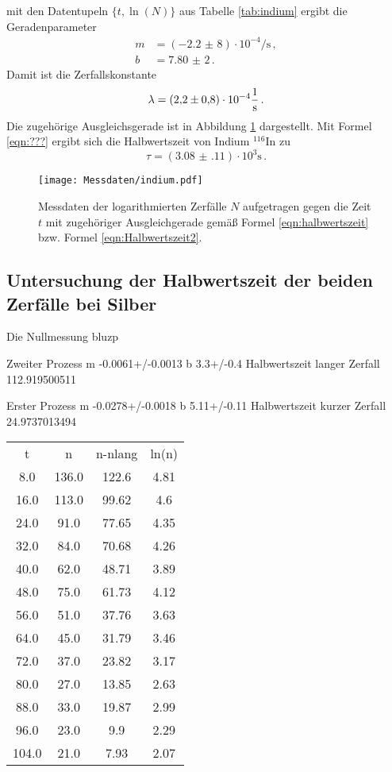 mit den Datentupeln $\{ t, \ln (N)\}$ aus Tabelle \ref{tab:indium} ergibt die Geradenparameter
\begin{align*}
	m &= (-\num{2,2(8)}) \cdot 10^{-4} \si{\per\second}  \, \mathrm{,} \\
	b &= \num{7,80(2)} \, \mathrm{.}
\end{align*}
Damit ist die Zerfallskonstante
\begin{equation*}
	\lambda = (\num{2,2(8)}) \cdot 10^{-4} \si{\per\second}  \, \mathrm{.} \\
\end{equation*}
Die zugehörige Ausgleichsgerade ist in Abbildung \ref{fig:indium} dargestellt.
Mit Formel \eqref{eqn:???} ergibt sich die Halbwertszeit von Indium $^{116}\mathrm{In}$
zu
\begin{equation*}
	\tau =  (\num{3.08(11)}) \cdot 10^3 \si{\second} \, \mathrm{.}
\end{equation*}
\begin{figure}
	\centering
	\texttt{[image: Messdaten/indium.pdf]}
	\caption{Messdaten der logarithmierten Zerfälle $N$ aufgetragen gegen die Zeit $t$ mit zugehöriger Ausgleichgerade gemäß Formel \eqref{eqn:halbwertszeit} bzw. Formel \eqref{eqn:Halbwertszeit2}.}
	\label{fig:indium}
\end{figure}






\subsection{Untersuchung der Halbwertszeit der beiden Zerfälle bei Silber}
Die Nullmessung bluzp


Zweiter Prozess
m -0.0061+/-0.0013
b 3.3+/-0.4
Halbwertszeit langer Zerfall 112.919500511

Erster Prozess
m  -0.0278+/-0.0018
b 5.11+/-0.11
Halbwertszeit kurzer Zerfall 24.9737013494


\begin{table}
\begin{tabular}{cccc}
t & n & n-nlang & ln(n) \\
8.0 & 136.0 & 122.6 & 4.81 \\
16.0 & 113.0 & 99.62 & 4.6 \\
24.0 & 91.0 & 77.65 & 4.35 \\
32.0 & 84.0 & 70.68 & 4.26 \\
40.0 & 62.0 & 48.71 & 3.89 \\
48.0 & 75.0 & 61.73 & 4.12 \\
56.0 & 51.0 & 37.76 & 3.63 \\
64.0 & 45.0 & 31.79 & 3.46 \\
72.0 & 37.0 & 23.82 & 3.17 \\
80.0 & 27.0 & 13.85 & 2.63 \\
88.0 & 33.0 & 19.87 & 2.99 \\
96.0 & 23.0 & 9.9 & 2.29 \\
104.0 & 21.0 & 7.93 & 2.07 \\
\end{tabular}
\end{table}


